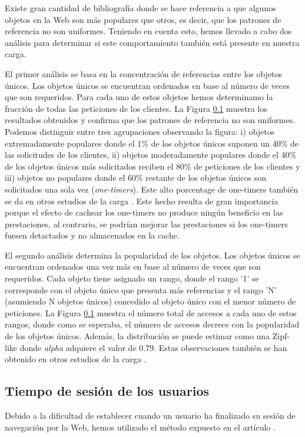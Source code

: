 \documentclass[twocolumn]{Jornadas}
\begin{document}
Existe gran cantidad de bibliografía \cite{} donde se hace referencia a que algunos objetos en la Web son más populares que otros, es decir, que los patrones de referencia no son uniformes. Teniendo en cuenta esto, hemos llevado a cabo dos análisis para determinar si este comportamiento también está presente en nuestra carga.

El primer análisis se basa en la concentración de referencias entre los objetos únicos. Los objetos únicos se encuentran ordenados en base al número de veces que son requeridos. Para cada uno de estos objetos hemos determinamo la fracción de todas las peticiones de los clientes. La Figura \ref{} muestra los resultados obtenidos y confirma que los patrones de referencia no son uniformes. Podemos distinguir entre tres agrupaciones observando la figura: i) objetos extremadamente populares donde el 1\% de los objetos únicos suponen un 40\% de las solicitudes de los clientes, ii) objetos moderadamente populares donde el 40\% de los objetos únicos más solicitados reciben el 80\% de peticiones de los clientes y iii) objetos no populares donde el 60\% restante de los objetos únicos son solicitados una sola vez (\emph{one-timers}). Este alto porcentage de one-timers también se da en otros estudios de la carga \cite{}.
Este hecho resulta de gran importancia porque el efecto de cachear los one-timers no produce ningún beneficio en las prestaciones, al contrario, se podrían mejorar las prestaciones si los one-timers fuesen detactados y no almacenados en la cache.

El segundo análisis determina la popularidad de los objetos. Los objetos únicos se encuentran ordenados una vez más en base al número de veces que son requeridos. Cada objeto tiene asignado un rango, donde el rango '1' se corresponde con el objeto único que presenta más referencias y el rango 'N' (asumiendo N objetos únicos) concedido al objeto único con el menor número de peticiones. La Figura \ref{} muestra el número total de accesos a cada uno de estos rangos, donde como se esperaba, el número de accesos decrece con la popularidad de los objetos únicos. Además, la distribución se puede estimar como una Zipf-like donde \emph{alpha} adquiere el valor de 0.79. Estas observaciones también se han obtenido en otros estudios de la carga \cite{}.

\subsection{Tiempo de sesión de los usuarios}
Debido a la dificultad de establecer cuando un usuario ha finalizado su sesión de navegación por la Web, hemos utilizado el método expuesto en el artículo \cite{}.
\end{document}
